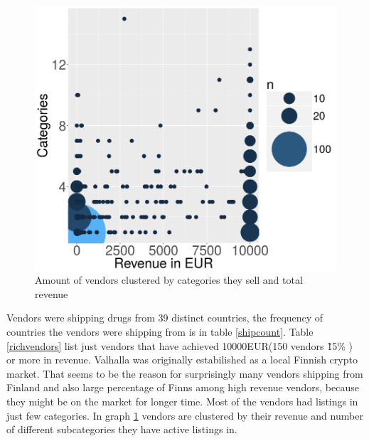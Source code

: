 \documentclass[
  digital, %
  table,   %
  lof,     %
  lot,     %
  oneside
]{fithesis3}
\begin{document}
\begin{figure}[!htb]
    \centering
    \includegraphics[scale=0.4]{catxrev}
    \centering
    \caption{Amount of vendors clustered by categories they sell and total revenue}
    \label{catxrev}
\end{figure}

Vendors were shipping drugs from 39 distinct countries,
the frequency of countries the vendors were shipping from is in table \ref{shipcount}.
Table \ref{richvendors} list just vendors that have achieved 10000EUR(150 vendors \~ 15\% ) or more in revenue.
Valhalla was originally estabilished as a local Finnish crypto market.
That seems to be the reason for surprisingly many vendors shipping from Finland and also large percentage
of Finns among high revenue vendors, because they might be on the market for longer time.
Most of the vendors had listings in just few categories.
In graph \ref{catxrev} vendors are clustered by their revenue and number of different subcategories they have 
active listings in.  
\end{document}
